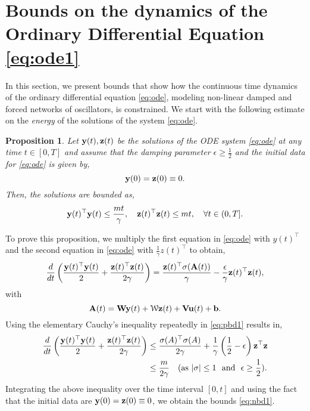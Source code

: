 \documentclass{article} \usepackage{iclr2021_conference,times}
\newtheorem{proposition}[theorem]{Proposition}
\newcommand{\cW}{\EuScript{W}}
\newcommand{\by}{{\bf y}}
\newcommand{\bz}{{\bf z}}
\newcommand{\bW}{{\bf W}}
\newcommand{\bu}{{\bf u}}
\newcommand{\bb}{{\bf b}}
\newcommand{\bV}{{\bf V}}
\newcommand{\bA}{{\bf A}}
\begin{document}
\section{Bounds on the dynamics of the Ordinary Differential Equation \eqref{eq:ode1}}
\label{sec:bd}
In this section, we present bounds that show how the continuous time dynamics of the ordinary differential equation \eqref{eq:ode}, modeling non-linear damped and forced networks of oscillators, is constrained. We start with the following estimate on the \emph{energy} of the solutions of the system \eqref{eq:ode}. 
\begin{proposition}
\label{prop:n1}
Let $\by(t),\bz(t)$ be the solutions of the ODE system \eqref{eq:ode} at any time $t \in [0,T]$ and assume that the damping parameter $\epsilon \geq \frac{1}{2}$ and the initial data for \eqref{eq:ode} is given by,
$$
\by(0) = \bz(0) \equiv 0.
$$
Then, the solutions are bounded as,
\begin{equation}
\label{eq:nbd1}
\by(t)^{\top}\by(t) \leq \frac{mt}{\gamma}, \quad \bz(t)^{\top}\bz(t) \leq mt, \quad \forall t \in (0,T].
\end{equation}
\end{proposition}
To prove this proposition, we multiply the first equation in \eqref{eq:ode} with $y(t)^\top$ and the second equation in \eqref{eq:ode} with $\frac{1}{\gamma}z(t)^\top$ to obtain,
\begin{equation}
    \label{eq:pbd1}
    \frac{d}{dt}\left(\frac{\by(t)^\top \by(t)}{2} + \frac{\bz(t)^\top \bz(t)}{2\gamma} \right) = \frac{\bz(t)^\top \sigma(\bA(t))}{\gamma} -\frac{\epsilon}{\gamma} \bz(t)^\top \bz(t),
\end{equation}
with 
$$
\bA(t) = \bW \by(t) + \cW \bz(t) + \bV \bu(t) + \bb.
$$
Using the elementary Cauchy's inequality repeatedly in \eqref{eq:pbd1} results in,
\begin{align*}
     \frac{d}{dt}\left(\frac{\by(t)^\top \by(t)}{2} + \frac{\bz(t)^\top \bz(t)}{2\gamma} \right) &\leq \frac{\sigma(A)^\top \sigma(A)}{2\gamma} + \frac{1}{\gamma}\left(\frac{1}{2} -\epsilon\right) \bz^{\top}\bz \\
     &\leq \frac{m}{2\gamma} \quad ({\rm as}~|\sigma| \leq 1 ~~{\rm and}~~\epsilon \geq \frac{1}{2}).
\end{align*}
Integrating the above inequality over the time interval $[0,t]$ and using the fact that the initial data are $\by(0) = \bz(0) \equiv 0$, we obtain the bounds \eqref{eq:nbd1}.
\end{document}
